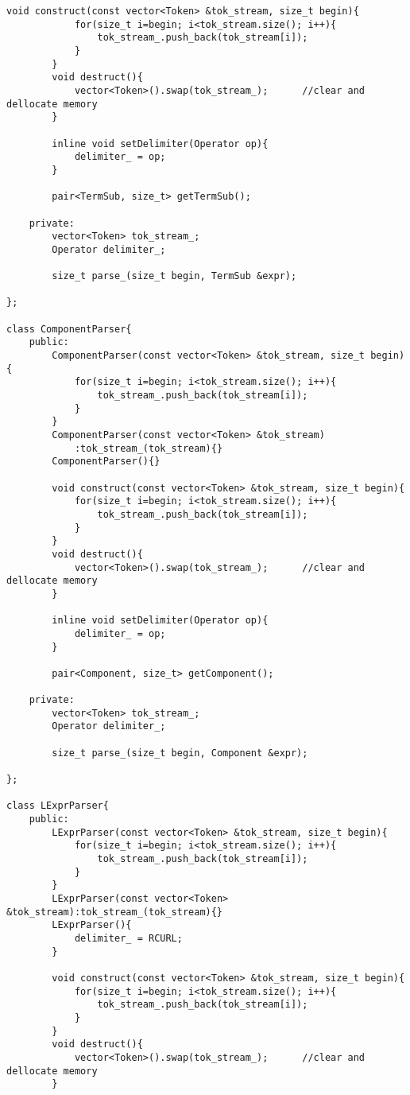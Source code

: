 \documentclass[pdftex,12pt,letterpaper,notitlepage,twoside]{article}
\begin{document}
\begin{lstlisting}[frame=single,caption={C program for testing}]
        void construct(const vector<Token> &tok_stream, size_t begin){
            for(size_t i=begin; i<tok_stream.size(); i++){
                tok_stream_.push_back(tok_stream[i]);
            }
        }
        void destruct(){
            vector<Token>().swap(tok_stream_);      //clear and dellocate memory
        }

        inline void setDelimiter(Operator op){
            delimiter_ = op;
        }

        pair<TermSub, size_t> getTermSub();

    private:
        vector<Token> tok_stream_;
        Operator delimiter_;

        size_t parse_(size_t begin, TermSub &expr);

};

class ComponentParser{
    public:
        ComponentParser(const vector<Token> &tok_stream, size_t begin){
            for(size_t i=begin; i<tok_stream.size(); i++){
                tok_stream_.push_back(tok_stream[i]);
            }
        }
        ComponentParser(const vector<Token> &tok_stream)
            :tok_stream_(tok_stream){}
        ComponentParser(){}

        void construct(const vector<Token> &tok_stream, size_t begin){
            for(size_t i=begin; i<tok_stream.size(); i++){
                tok_stream_.push_back(tok_stream[i]);
            }
        }
        void destruct(){
            vector<Token>().swap(tok_stream_);      //clear and dellocate memory
        }

        inline void setDelimiter(Operator op){
            delimiter_ = op;
        }

        pair<Component, size_t> getComponent();

    private:
        vector<Token> tok_stream_;
        Operator delimiter_;

        size_t parse_(size_t begin, Component &expr);

};

class LExprParser{
    public:
        LExprParser(const vector<Token> &tok_stream, size_t begin){
            for(size_t i=begin; i<tok_stream.size(); i++){
                tok_stream_.push_back(tok_stream[i]);
            }
        }
        LExprParser(const vector<Token> &tok_stream):tok_stream_(tok_stream){}
        LExprParser(){
            delimiter_ = RCURL;
        }

        void construct(const vector<Token> &tok_stream, size_t begin){
            for(size_t i=begin; i<tok_stream.size(); i++){
                tok_stream_.push_back(tok_stream[i]);
            }
        }
        void destruct(){
            vector<Token>().swap(tok_stream_);      //clear and dellocate memory
        }


\end{lstlisting}
\end{document}
